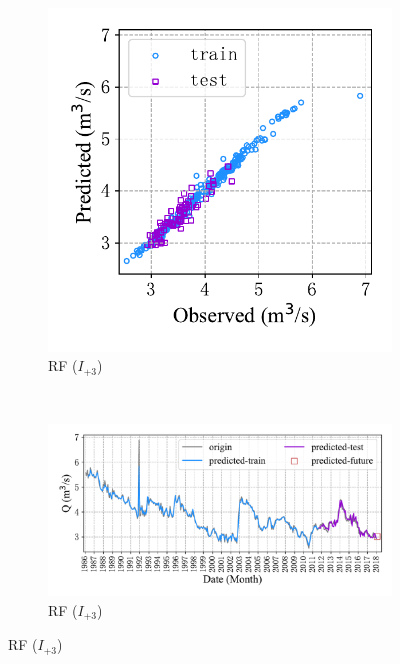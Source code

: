 \begin{figure}[!htbp]
\begin{subfigure}[b]{0.615\textwidth}
  \end{subfigure}
  \\
  \begin{subfigure}[b]{0.305\textwidth}
    \includegraphics[width=\textwidth]{Img/chap4_spr/out1/spr_scatter_in_3_out_1_rf.pdf}
    \vspace{-1.2cm}
    \caption{RF ($I_{+3}$)}
    \label{fig:spr_scatter_in_3_out_1_rf}
  \end{subfigure}
  ~
  \begin{subfigure}[b]{0.615\textwidth}
    \includegraphics[width=\textwidth]{Img/chap4_spr/out1/spr_series_in_3_out_1_rf.pdf}
    \vspace{-1.2cm}
    \caption{RF ($I_{+3}$)}
    \label{fig:spr_series_in_3_out_1_rf}

\end{subfigure}
\end{figure}
